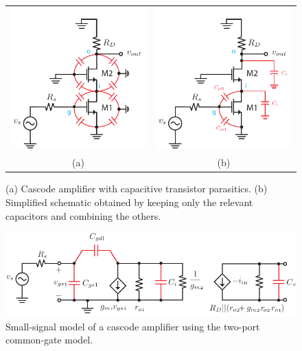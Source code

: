 \begin{figure}[H]
\centering
\begin{tabular}{cc}
\includegraphics[scale=0.96]{12cascode_caps} &
\includegraphics[scale=0.96]{13cascode_caps_simple}\\
(a) & (b)\\
\end{tabular}
\caption{(a) Cascode amplifier with capacitive transistor parasitics.  (b) Simplified schematic obtained by keeping only the relevant capacitors and combining the others.}
\label{fig:12cascode_caps}
\end{figure}
\newpage
\begin{figure}[t]
\centering
\includegraphics[scale=1.15]{14cascode_ac_ss}
\caption{Small-signal model of a cascode amplifier using the two-port common-gate model.} \label{fig:14cascode_ac_ss}
\end{figure}
